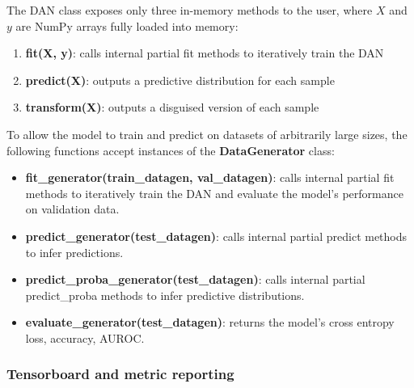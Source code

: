 \documentclass{proc}
\begin{document}
The DAN class exposes only three in-memory methods to the user, where $X$ and $y$ are NumPy arrays fully loaded into memory:

\begin{enumerate}
\item{\textbf{fit(X, y)}}: calls internal partial fit methods to iteratively train the DAN
\item{\textbf{predict(X)}}: outputs a predictive distribution for each sample
\item{\textbf{transform(X)}}: outputs a disguised version of each sample
\end{enumerate}
 
To allow the model to train and predict on datasets of arbitrarily large sizes, the following functions accept instances of the \textbf{DataGenerator} class:

\begin{itemize}
\item{\textbf{fit\_generator(train\_datagen, val\_datagen)}}: calls internal partial fit methods to iteratively train the DAN and evaluate the model's performance on validation data.
\item{\textbf{predict\_generator(test\_datagen)}}: calls internal partial predict methods to infer predictions.
\item{\textbf{predict\_proba\_generator(test\_datagen)}}: calls internal partial predict\_proba methods to infer predictive distributions.
\item{\textbf{evaluate\_generator(test\_datagen)}}: returns the model's cross entropy loss, accuracy, AUROC.
\end{itemize}

\subsubsection{Tensorboard and metric reporting}
\end{document}
